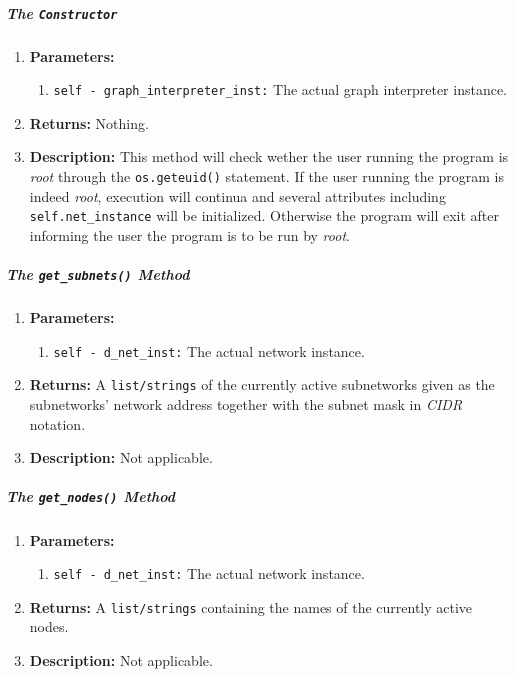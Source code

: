     \subparagraph{The \texttt{Constructor}}
        \begin{enumerate}
            \item \textbf{Parameters:}
            \begin{enumerate}
                \item \texttt{self - graph\_interpreter\_inst:} The actual graph interpreter instance.
            \end{enumerate}
            \item \textbf{Returns:} Nothing.
            \item \textbf{Description:} This method will check wether the user running the program is \textit{root} through the \texttt{os.geteuid()} statement. If the user running the program is indeed \textit{root}, execution will continua and several attributes including \texttt{self.net\_instance} will be initialized. Otherwise the program will exit after informing the user the program is to be run by \textit{root}.
        \end{enumerate}

    \subparagraph{The \texttt{get\_subnets()} Method}
        \begin{enumerate}
            \item \textbf{Parameters:}
            \begin{enumerate}
                \item \texttt{self - d\_net\_inst:} The actual network instance.
            \end{enumerate}
            \item \textbf{Returns:} A \texttt{list/strings} of the currently active subnetworks given as the subnetworks' network address together with the subnet mask in \textit{CIDR} notation.
            \item \textbf{Description:} Not applicable.
        \end{enumerate}

    \subparagraph{The \texttt{get\_nodes()} Method}
        \begin{enumerate}
            \item \textbf{Parameters:}
            \begin{enumerate}
                \item \texttt{self - d\_net\_inst:} The actual network instance.
            \end{enumerate}
            \item \textbf{Returns:} A \texttt{list/strings} containing the names of the currently active nodes.
            \item \textbf{Description:} Not applicable.
        \end{enumerate}

